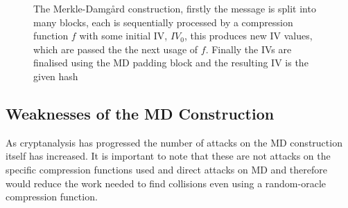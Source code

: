 \documentclass[a4paper,12pt]{article}
\begin{document}
\begin{figure}
    \begin{center}
\end{center}
\caption{The Merkle-Damg\r{a}rd construction, firstly the message is split into many blocks, each is sequentially processed by a compression function $f$ with some initial IV, $IV_0$, this produces new IV values, which are passed the the next usage of $f$. Finally the IVs are finalised using the MD padding block and the resulting IV is the given hash}
\label{fig:mdpic}
\end{figure}

\subsection{Weaknesses of the MD Construction}
As cryptanalysis has progressed the number of attacks on the MD construction itself has increased\cite{r1}\cite{r2}. It is important to note that these are not attacks on the specific compression functions used and direct attacks on MD and therefore would reduce the work needed to find collisions even using a random-oracle compression function.
\end{document}
